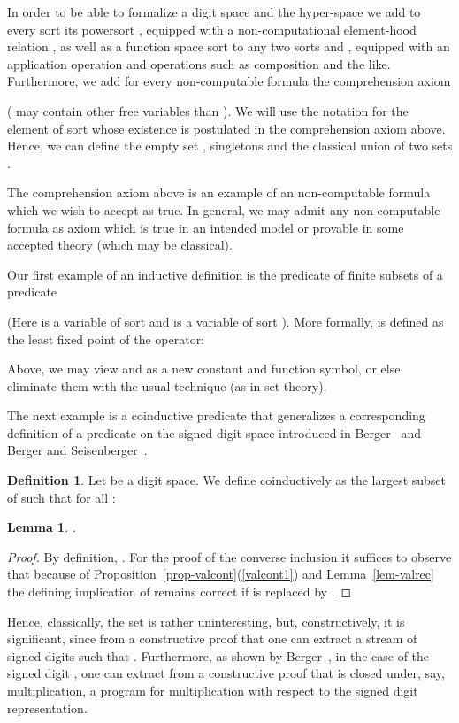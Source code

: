 \documentclass[microtype]{jloganal}
\theoremstyle{plain}
\newtheorem{lemma}[theorem]{Lemma}
\theoremstyle{definition}
\newtheorem{definition}[theorem]{Definition}
\begin{document}
In order to be able to formalize a digit space  and the hyper-space
 we add to every sort  its powersort ,
equipped with a non-computational element-hood relation ,
as well as a
function space sort  to any two sorts  and ,
equipped with an application operation and operations such as composition
and the like. Furthermore, we add for every non-computable formula  the 
comprehension axiom

( may contain other free variables than ).
We will use the notation  for the element  of sort
 whose existence is postulated in the comprehension axiom above.
Hence, we can define the empty set ,
singletons  and the classical union of two sets
.

The comprehension axiom above is an example of an non-computable formula which we
wish to accept as true. In general, we may admit any non-computable formula
as axiom which is true in an intended model or provable in some
accepted theory (which may be classical).

Our first example of an inductive definition is the predicate  of
finite subsets of a predicate 

(Here  is a variable of sort  and  is a variable of sort ).
More formally,  is defined as the least fixed point of the operator:

Above, we may view  and  as a new constant and function
symbol, or else eliminate them with the usual technique (as in set theory).


The next example is a coinductive predicate that generalizes a corresponding
definition of a predicate  on the signed digit space 
introduced in Berger~\cite{Berger11} and Berger and Seisenberger~\cite{SeisenBerger10}.
\begin{definition}
\label{def-coco}
Let  be a digit space.
We define coinductively  as the largest subset of  such that 
for all :

\end{definition}


\begin{lemma}
\label{lem-coco-space}
.
\end{lemma} 
\begin{proof}
By definition, . For the proof of the converse inclusion 
it suffices to observe that because of Proposition~\ref{prop-valcont}(\ref{valcont1}) and Lemma~\ref{lem-valrec} the defining implication of  remains
correct if  is replaced by .
\end{proof}
Hence, classically, the set  is rather uninteresting, 
but, constructively, it is significant, since 
from a constructive proof that  one can extract a  
stream of signed digits  such that .
Furthermore, as shown by Berger~\cite{Berger11}, in the case of 
the signed digit , one can extract
from a constructive proof that  is closed under, say, 
multiplication, a program for multiplication with respect
to the signed digit representation.
\end{document}
